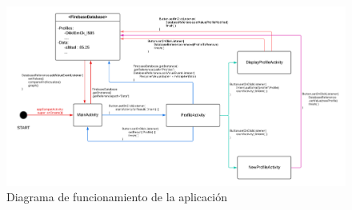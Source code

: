\documentclass[../main]{subfiles}
\begin{document}
\newpage
\begin{landscape}
	\begin{figure}[H]
		\centering
		\includegraphics[height=0.86\textheight]{res/appDiagram.png}
		\caption{Diagrama de funcionamiento de la aplicación}
	\end{figure}
\end{landscape}
\newpage
\end{document}
